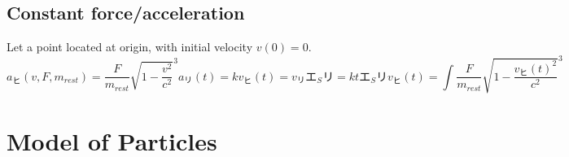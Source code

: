 \documentclass[preprint]{ptephy_v1}%
\newcommand{\jp}[1]{#1}
\newcommand{\jp}[1]{\text{#1}}
\begin{document}
\subsection{Constant force/acceleration}
Let a point located at origin, with initial velocity $v(0)=0$.
\begin{subequations}
    \begin{equation}
        a_\jp{ヒ}(v, F, m_{rest})=\frac{F}{m_{rest}}\sqrt{1-\frac{v^2}{c^2}}^3
    \end{equation}
    \begin{equation}
        a_\jp{リ}(t)=k
    \end{equation}
    \begin{equation}
        v_\jp{ヒ}(t)=v_\jp{リ}\jp{エ}_S\jp{リ}=kt\jp{エ}_S\jp{リ}
    \end{equation}
    \begin{equation}
        v_\jp{ヒ}(t)=\int \frac{F}{m_{rest}}\sqrt{1-\frac{v_\jp{ヒ}(t)^2}{c^2}}^3
    \end{equation}
\end{subequations}


\section{Model of Particles}
\end{document}

